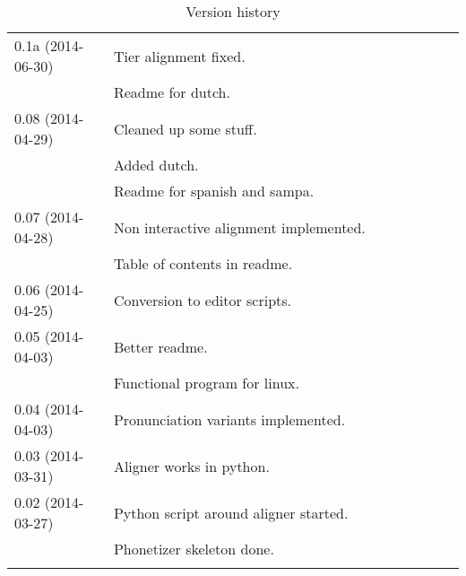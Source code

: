 \begin{longtable}{|p{0.22\linewidth}p{0.8\linewidth}|}
	\hline
	0.1a (2014-06-30) & \tabitem Tier alignment fixed.\\
		& \tabitem Readme for dutch.\\
	\hline
	0.08 (2014-04-29) & \tabitem Cleaned up some stuff.\\
		& \tabitem Added dutch.\\
		& \tabitem Readme for spanish and sampa.\\
	\hline
	0.07 (2014-04-28) & \tabitem Non interactive alignment implemented.\\
		& \tabitem Table of contents in readme.\\
	\hline
	0.06 (2014-04-25) & \tabitem Conversion to editor scripts.\\
	\hline
	0.05 (2014-04-03) & \tabitem Better readme.\\
		& \tabitem Functional program for linux.\\
	\hline
	0.04 (2014-04-03) & \tabitem Pronunciation variants implemented.\\
	\hline
	0.03 (2014-03-31) & \tabitem Aligner works in python.\\
	\hline
	0.02 (2014-03-27) & \tabitem Python script around aligner started.\\
		& \tabitem Phonetizer skeleton done.\\
	\hline
	\caption{Version history}
\end{longtable}



